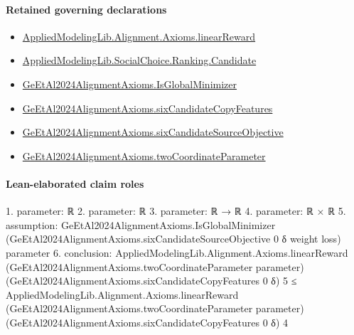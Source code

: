 \documentclass[10pt]{article}
\begin{document}
\paragraph{Retained governing declarations}
\begin{itemize}\raggedright
\item \hyperlink{library-prerequisite-4a32ddda17499d70}{Applied\allowbreak{}Modeling\allowbreak{}Lib.\allowbreak{}Alignment.\allowbreak{}Axioms.\allowbreak{}linear\allowbreak{}Reward}
\item \hyperlink{library-prerequisite-8c0e6c25845ae78a}{Applied\allowbreak{}Modeling\allowbreak{}Lib.\allowbreak{}Social\allowbreak{}Choice.\allowbreak{}Ranking.\allowbreak{}Candidate}
\item \hyperlink{governing-declaration-b949f8b742cc6742}{Ge\allowbreak{}Et\allowbreak{}Al2024\allowbreak{}Alignment\allowbreak{}Axioms.\allowbreak{}Is\allowbreak{}Global\allowbreak{}Minimizer}
\item \hyperlink{governing-declaration-f2ecd36c5ee0c77a}{Ge\allowbreak{}Et\allowbreak{}Al2024\allowbreak{}Alignment\allowbreak{}Axioms.\allowbreak{}six\allowbreak{}Candidate\allowbreak{}Copy\allowbreak{}Features}
\item \hyperlink{governing-declaration-860b6034e7e4713e}{Ge\allowbreak{}Et\allowbreak{}Al2024\allowbreak{}Alignment\allowbreak{}Axioms.\allowbreak{}six\allowbreak{}Candidate\allowbreak{}Source\allowbreak{}Objective}
\item \hyperlink{governing-declaration-9a763b52051bd8db}{Ge\allowbreak{}Et\allowbreak{}Al2024\allowbreak{}Alignment\allowbreak{}Axioms.\allowbreak{}two\allowbreak{}Coordinate\allowbreak{}Parameter}
\end{itemize}
\paragraph{Lean-elaborated claim roles}\begin{ReviewVerbatim}
1. parameter: ℝ
2. parameter: ℝ
3. parameter: ℝ → ℝ
4. parameter: ℝ × ℝ
5. assumption: GeEtAl2024AlignmentAxioms.IsGlobalMinimizer (GeEtAl2024AlignmentAxioms.sixCandidateSourceObjective 0 δ weight loss)
  parameter
6. conclusion: AppliedModelingLib.Alignment.Axioms.linearReward (GeEtAl2024AlignmentAxioms.twoCoordinateParameter parameter)
    (GeEtAl2024AlignmentAxioms.sixCandidateCopyFeatures 0 δ) 5 ≤
  AppliedModelingLib.Alignment.Axioms.linearReward (GeEtAl2024AlignmentAxioms.twoCoordinateParameter parameter)
    (GeEtAl2024AlignmentAxioms.sixCandidateCopyFeatures 0 δ) 4
\end{ReviewVerbatim}
\end{document}
